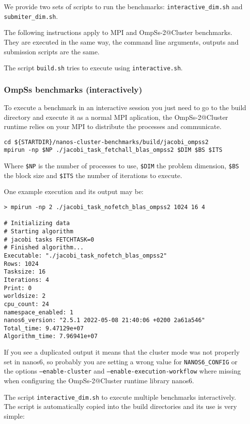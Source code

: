 \documentclass{article}
\newcommand{\code}[1]{\texttt{#1}}
\begin{document}
We provide two sets of scripts to run the benchmarks:
\code{interactive\_dim.sh} and \code{submiter\_dim.sh}.

The following instructions apply to MPI and OmpSs-2@Cluster
benchmarks.  They are executed in the same way, the command line
arguments, outputs and submission scripts are the same.

The script \code{build.sh} tries to execute using
\code{interactive.sh}.

\subsubsection{OmpSs benchmarks (interactively)}
To execute a benchmark in an interactive session you just need to go
to the build directory and execute it as a normal MPI aplication, the
OmpSs-2@Cluster runtime relies on your MPI to distribute the processes
and communicate.

\begin{lstlisting}
cd ${STARTDIR}/nanos-cluster-benchmarks/build/jacobi_ompss2
mpirun -np $NP ./jacobi_task_fetchall_blas_ompss2 $DIM $BS $ITS
\end{lstlisting}

Where \code{\$NP} is the number of processes to use, \code{\$DIM} the
problem dimension, \code{\$BS} the block size and \code{\$ITS} the
number of iterations to execute.

One example execution and its output may be:
\begin{lstlisting}
> mpirun -np 2 ./jacobi_task_nofetch_blas_ompss2 1024 16 4

# Initializing data
# Starting algorithm
# jacobi tasks FETCHTASK=0
# Finished algorithm...
Executable: "./jacobi_task_nofetch_blas_ompss2"
Rows: 1024
Tasksize: 16
Iterations: 4
Print: 0
worldsize: 2
cpu_count: 24
namespace_enabled: 1
nanos6_version: "2.5.1 2022-05-08 21:40:06 +0200 2a61a546"
Total_time: 9.47129e+07
Algorithm_time: 7.96941e+07
\end{lstlisting}

If you see a duplicated output it means that the cluster mode was not
properly set in nanos6, so probably you are setting a wrong value for
\code{NANOS6\_CONFIG} or the options \code{--enable-cluster} and
\code{--enable-execution-workflow} where missing when configuring the
OmpSs-2@Cluster runtime library nanos6.

The script \code{interactive\_dim.sh} to execute multiple benchmarks
interactively. The script is automatically copied into the build
directories and its use is very simple:
\end{document}
